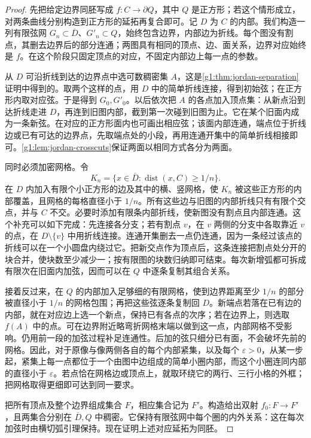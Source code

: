 \begin{proof}
	先把给定边界同胚写成 \(f:C\to\partial Q\)，其中 \(Q\) 是正方形；若这个情形成立，对两条曲线分别构造到正方形的延拓再复合即可。记 \(D\) 为 \(C\) 的内部。我们构造一列有限弦网 \(G_n\subset\overline D\)、\(G'_n\subset Q\)，始终包含边界，内部边为折线。每个图没有割点，其删去边界后的部分连通；两图具有相同的顶点、边、面关系，边界对应始终是 \(f\)。在这个阶段只固定顶点的对应，不固定内部边上每一点的参数。

	从 \(D\) 可沿折线到达的边界点中选可数稠密集 \(A\)，这是\cref{g1:thm:jordan-separation}证明中得到的。取两个这样的点，用 \(D\) 中的简单折线连接，得到初始弦；在正方形内取对应弦。于是得到 \(G_0,G'_0\)。以后依次把 \(A\) 的各点加入顶点集：从新点沿到达折线走进 \(D\)，再连到旧图内部，截到第一次碰到旧图为止。它在某个旧面内成为一条新弦。在对应的正方形面内也可画出相应弦；该面内部连通，端点位于折线边或已有可达的边界点，先取端点处的小段，再用连通开集中的简单折线相接即可。\cref{g1:lem:jordan-crosscuts}保证两面以相同方式各分为两面。

	同时必须加密网格。令
	\[
		K_n=\{x\in\overline D:\operatorname{dist}(x,C)\ge 1/n\}.
	\]
	在 \(D\) 内加入有限个小正方形的边及其中的横、竖网格，使 \(K_n\) 被这些正方形的内部覆盖，且网格的每格直径小于 \(1/n\)。所有这些边与旧图的内部折线只有有限个交点，并与 \(C\) 不交。必要时添加有限条内部折线，使新图没有割点且内部连通。这个补充可以如下完成：先连接各分支；若有割点 \(v\)，在 \(v\) 两侧的分支中各取靠近 \(v\) 的点，在 \(D\setminus\{v\}\) 中用折线连接。连通开集删去一点仍连通，因为一条经过该点的折线可以在一个小圆盘内绕过它。把新交点作为顶点后，这条连接把割点处分开的块合并，使块数至少减少一；按有限图的块数归纳即可结束。每次新增弧都可拆成有限次在旧面内加弦，因而可以在 \(Q\) 中逐条复制其组合关系。

	接着反过来，在 \(Q\) 的内部加入足够细的有限网格，使到边界距离至少 \(1/n\) 的部分被直径小于 \(1/n\) 的网格包围；再把这些弦逐条复制回 \(D\)。新端点若落在已有边的内部，就在对应边上选一个新点，保持已有各点的次序；若在边界上，则选取 \(f(A)\) 中的点。可在边界附近略弯折网格末端以做到这一点，内部网格不受影响。仍用前一段的加弦过程补足连通性。后加的弦只细分已有面，不会破坏先前的网格。因此，对于原像与像两侧各自的每个内部紧集，以及每个 \(\varepsilon>0\)，从某一步起，紧集上每一点都位于一个由图中边组成的简单小圈内部，而这个小圈连同内部的直径小于 \(\varepsilon\)。若点恰在网格边或顶点上，就取环绕它的两行、三行小格的外框；把网格取得更细即可达到同一要求。

	把所有顶点及整个边界组成集合 \(F\)，相应集合记为 \(F'\)。构造给出双射 \(f_0:F\to F'\)，且两集合分别在 \(\overline D,Q\) 中稠密。它保持有限弦网中每个圈的内外关系：这在每次加弦时由横切弧引理保持。现在证明上述对应延拓为同胚。


\end{proof}
